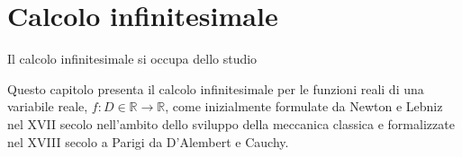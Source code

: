 \documentclass[letterpaper,10pt,english]{jupyterBook}
\begin{document}
\chapter{Calcolo infinitesimale}
\label{\detokenize{ch/infinitesimal_calculus:calcolo-infinitesimale}}\label{\detokenize{ch/infinitesimal_calculus:infinitesimal-calculus}}\label{\detokenize{ch/infinitesimal_calculus::doc}}
\sphinxAtStartPar
Il calcolo infinitesimale si occupa dello studio 

\sphinxAtStartPar
Questo capitolo presenta il calcolo infinitesimale per le funzioni reali di una variabile reale, \(f: D \in \mathbb{R} \rightarrow \mathbb{R}\), come inizialmente formulate da Newton \sphinxstylestrong{{[}REF{]}} e Lebniz \sphinxstylestrong{{[}REF{]}} nel XVII secolo nell’ambito dello sviluppo della meccanica classica \sphinxstylestrong{{[}REF{]}} e formalizzate nel XVIII secolo a Parigi da D’Alembert e Cauchy.
\end{document}
